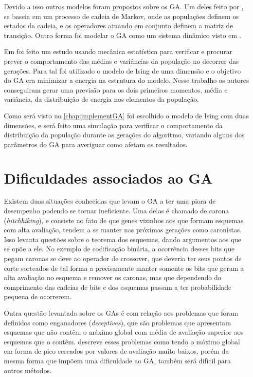 Devido a isso outros modelos foram propostos sobre os GA. Um deles feito por \citeauthor{Nix1992}, se baseia em um processo de cadeia de Markov, onde as populações definem os estados da cadeia, e os operadores atuando em conjunto definem a matriz de transição. Outro forma foi modelar o GA como um sistema dinâmico visto em .

Em  foi feito um estudo usando mecânica estatística para verificar e procurar prever o comportamento das médias e variâncias da população no decorrer das gerações. Para tal foi utilizado o modelo de Ising de uma dimensão e o objetivo do GA era minimizar a energia na estrutura do modelo. Nesse trabalho os autores conseguiram gerar uma previsão para os dois primeiros momentos, média e variância, da distribuição de energia nos elementos da população.

Como será visto no \autoref{chap:implementGA} foi escolhido o modelo de Ising com duas dimensões, e será feito uma simulação para verificar o comportamento da distribuição da população durante as gerações do algoritmo, variando alguns dos parâmetros do GA para averiguar como afetam os resultados.

\section{Dificuldades associados ao GA}
\label{sec:problemas_GA}
Existem duas situações conhecidas que levam o GA a ter uma piora de desempenho podendo se tornar ineficiente. Uma delas é chamado de carona (\textit{hitchhiking}), e consiste no fato de que genes vizinhos aos que formam esquemas com alta avaliação, tendem a se manter nas próximas gerações como caronistas. Isso levanta questões sobre o teorema dos esquemas, dando argumentos aos que se opõe a ele. No exemplo de codificação binária, a ocorrência desses bits que pegam caronas se deve ao operador de crossover, que deveria ter seus pontos de corte sorteados de tal forma a precisamente manter somente os bits que geram a alta avaliação no esquema e remover os caronas, mas que dependendo do comprimento das cadeias de bits e dos esquemas passam a ter probabilidade pequena de ocorrerem. 

Outra questão levantada sobre os GAs é com relação aos problemas que foram definidos como enganadores (\textit{deceptives}), que são problemas que apresentam esquemas que não contêm o máximo global com média de avaliação superior aos esquemas que o contêm. \citeauthor{Linden2008} descreve esses problemas como tendo o máximo global em forma de pico cercados por valores de avaliação muito baixos, porém da mesma forma que impõem uma dificuldade ao GA, também será difícil para outros métodos.

